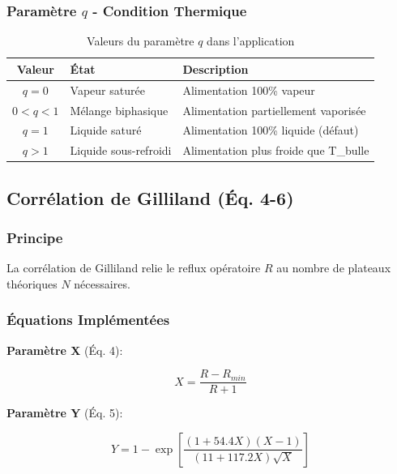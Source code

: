 \documentclass[11pt,a4paper]{article}
\begin{document}
\subsubsection{Paramètre $q$ - Condition Thermique}

\begin{table}[h]
\centering
\begin{tabular}{clp{6cm}}
\toprule
\textbf{Valeur} & \textbf{État} & \textbf{Description} \\
\midrule
$q = 0$ & Vapeur saturée & Alimentation 100\% vapeur \\
$0 < q < 1$ & Mélange biphasique & Alimentation partiellement vaporisée \\
$q = 1$ & Liquide saturé & Alimentation 100\% liquide (défaut) \\
$q > 1$ & Liquide sous-refroidi & Alimentation plus froide que T\_bulle \\
\bottomrule
\end{tabular}
\caption{Valeurs du paramètre $q$ dans l'application}
\end{table}

\subsection{Corrélation de Gilliland (Éq. 4-6)}

\subsubsection{Principe}

La corrélation de Gilliland relie le reflux opératoire $R$ au nombre de plateaux théoriques $N$ nécessaires.

\subsubsection{Équations Implémentées}

\textbf{Paramètre X} (Éq. 4):

\begin{tcolorbox}[colback=yellow!10,colframe=orange!50!black,title=Équation 4: Gilliland - X]
\begin{equation}
X = \frac{R - R_{min}}{R + 1}
\end{equation}
\end{tcolorbox}

\textbf{Paramètre Y} (Éq. 5):

\begin{tcolorbox}[colback=yellow!10,colframe=orange!50!black,title=Équation 5: Gilliland - Y]
\begin{equation}
Y = 1 - \exp\left[\frac{(1 + 54.4X)(X-1)}{(11 + 117.2X)\sqrt{X}}\right]
\end{equation}
\end{tcolorbox}
\end{document}
